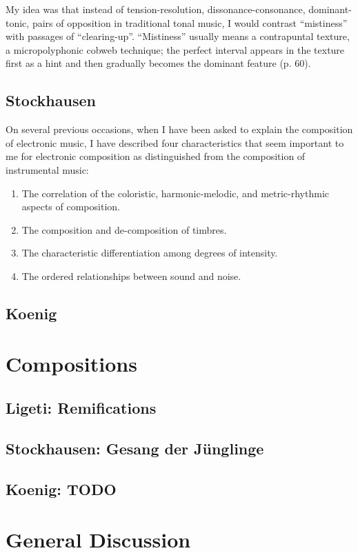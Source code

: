 \documentclass[a4paper,11pt]{article}
\begin{document}
My idea was that instead of tension-resolution, dissonance-consonance, dominant-tonic, pairs of opposition in traditional tonal music, I would contrast ``mistiness'' with passages of ``clearing-up''. ``Mistiness'' usually means a contrapuntal texture, a micropolyphonic cobweb technique; the perfect interval appears in the texture first as a hint and then gradually becomes the dominant feature (p. 60).

\subsection{Stockhausen}
\label{sub:eshtetic_stockhausen}

On several previous occasions, when I have been asked to explain the composition of electronic music, I have described four characteristics that seem important to me for electronic composition as distinguished from the composition of instrumental music:

\begin{enumerate}
  \item The correlation of the coloristic, harmonic-melodic, and metric-rhythmic aspects of composition.
  \item The composition and de-composition of timbres.
  \item The characteristic differentiation among degrees of intensity.
  \item The ordered relationships between sound and noise.
\end{enumerate}

\subsection{Koenig}
\label{sub:eshtetic_koenig}

\section{Compositions}
\label{sec:compositions}

\subsection{Ligeti: Remifications}
\label{sub:composition_ligeti}

\subsection{Stockhausen: Gesang der J{\"u}nglinge}
\label{sub:composition_stockhausen}

\subsection{Koenig: TODO}
\label{sub:composition_koenig}

\section{General Discussion}
\label{sec:general_discussion}

\printbibliography[title={Bibliography}]
\end{document}
